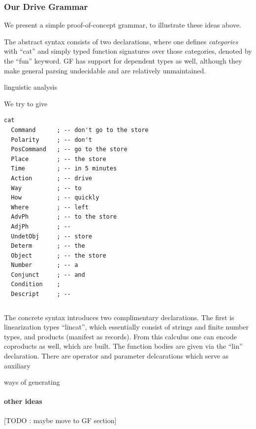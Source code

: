 \documentclass[a4paper, 11pt]{article}
\begin{document}
\subsubsection{Our Drive Grammar}

We present a simple proof-of-concept grammar, to illustrate these ideas above.

The abstract syntax consists of two declarations, where one defines
\emph{categories} with ``cat'' and simply typed function signatures over those
categories, denoted by the ``fun'' keyword. GF has support for dependent types
as well, although they make general parsing undecidable and are relatively
unmaintained.

linguistic analysis

We try to give 

\begin{verbatim}
cat
  Command      ; -- don't go to the store
  Polarity     ; -- don't
  PosCommand   ; -- go to the store
  Place        ; -- the store
  Time         ; -- in 5 minutes
  Action       ; -- drive
  Way          ; -- to
  How          ; -- quickly
  Where        ; -- left
  AdvPh        ; -- to the store
  AdjPh        ; -- 
  UndetObj     ; -- store
  Determ       ; -- the
  Object       ; -- the store
  Number       ; -- a
  Conjunct     ; -- and
  Condition    ;
  Descript     ; -- 
\end{verbatim}

\begin{verbatim}
\end{verbatim}


 
The concrete syntax introduces two complimentary declarations. The first is
linearization types ``lincat'', which essentially consist of strings and finite
number types, and products (manifest as records). From this calculus one can
encode coproducts as well, which are built. The function bodies are given
via the ``lin'' declaration. There are operator and parameter delcarations which
serve as auxiliary 

ways
of generating 



\paragraph{other ideas}
[TODO : maybe move to GF section]
\end{document}
